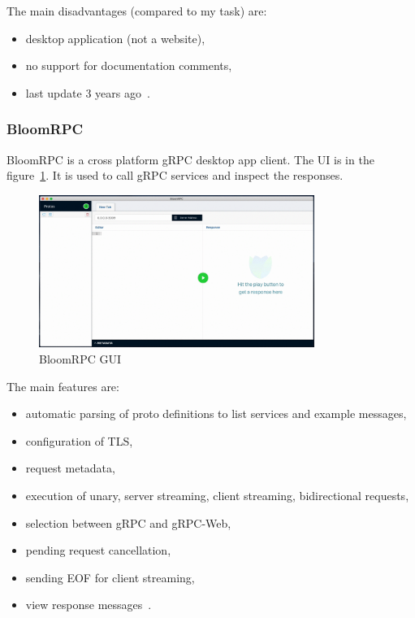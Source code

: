 The main disadvantages (compared to my task) are:
\begin{itemize}
    \item desktop application (not a website),
    \item no support for documentation comments,
    \item last update 3 years ago~\cite{grpc-wombat}.
\end{itemize}


\subsubsection{BloomRPC}
BloomRPC is a cross platform gRPC desktop app client.
The UI is in the figure~\ref{fig:grpc-bloomrpc}.
It is used to call gRPC services and inspect the responses.
\cite{grpc-bloomrpc}

\begin{figure}[hbt!]
    \centering
    \captionsetup{justification=centering}
    \includegraphics[width=0.8\textwidth]{images/grpc/bloomrpc}
    \caption{BloomRPC GUI~\cite{grpc-bloomrpc}}
    \label{fig:grpc-bloomrpc}
\end{figure}

The main features are:
\begin{itemize}
    \item automatic parsing of proto definitions to list services and example messages,
    \item configuration of TLS,
    \item request metadata,
    \item execution of unary, server streaming, client streaming, bidirectional requests,
    \item selection between gRPC and gRPC-Web,
    \item pending request cancellation,
    \item sending EOF for client streaming,
    \item view response messages~\cite{grpc-bloomrpc}.
\end{itemize}

